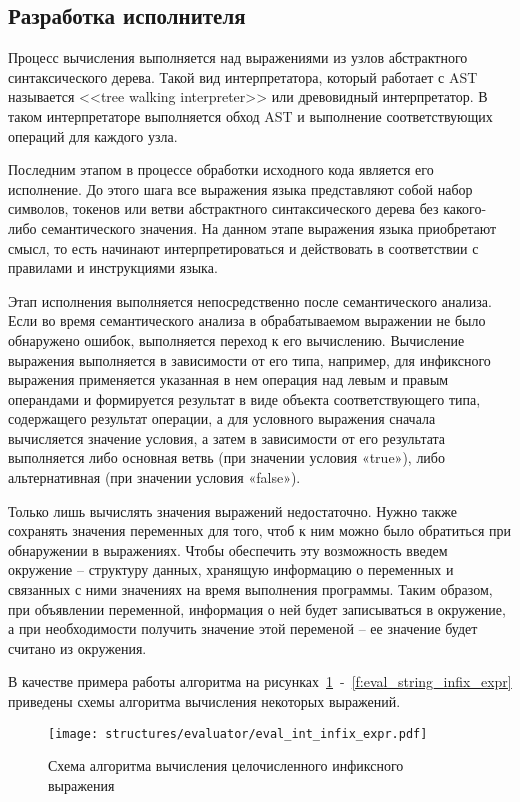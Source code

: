 \subsection{Разработка исполнителя}

Процесс вычисления выполняется над выражениями из узлов абстрактного синтаксического дерева.
Такой вид интерпретатора, который работает с AST называется <<tree walking interpreter>> или древовидный интерпретатор.
В таком интерпретаторе выполняется обход AST и выполнение соответствующих операций для каждого узла.

Последним этапом в процессе обработки исходного кода является его исполнение.
До этого шага все выражения языка представляют собой набор символов, токенов или ветви абстрактного синтаксического дерева без какого-либо семантического значения.
На данном этапе выражения языка приобретают смысл, то есть начинают интерпретироваться и действовать в соответствии с правилами и инструкциями языка.

Этап исполнения выполняется непосредственно после семантического анализа.
Если во время семантического анализа в обрабатываемом выражении не было обнаружено ошибок, выполняется переход к его вычислению.
Вычисление выражения выполняется в зависимости от его типа, например,
для инфиксного выражения применяется указанная в нем операция над левым и правым операндами и формируется результат в виде объекта соответствующего типа,
содержащего результат операции, а для условного выражения сначала вычисляется значение условия,
а затем в зависимости от его результата выполняется либо основная ветвь (при значении условия «true»), либо альтернативная (при значении условия «false»).

Только лишь вычислять значения выражений недостаточно.
Нужно также сохранять значения переменных для того, чтоб к ним можно было обратиться при обнаружении в выражениях.
Чтобы обеспечить эту возможность введем окружение – структуру данных, хранящую информацию о переменных и связанных с ними значениях на время выполнения программы.
Таким образом, при объявлении переменной, информация о ней будет записываться в окружение, а при необходимости получить значение этой переменой – ее значение будет считано из окружения.

В качестве примера работы алгоритма на рисунках~\ref{f:eval_int_infix_expr}~-~\ref{f:eval_string_infix_expr} приведены схемы алгоритма вычисления некоторых выражений.

\clearpage

\begin{figure}[!htp]
	\centering
	\texttt{[image: structures/evaluator/eval\_int\_infix\_expr.pdf]}
	\caption{Схема алгоритма вычисления целочисленного инфиксного выражения}
	\label{f:eval_int_infix_expr}
\end{figure}

